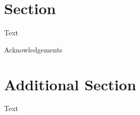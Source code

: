 \documentclass[sigconf,anonymous,review]{acmart}
\begin{document}

\section{Section}
Text

\begin{acks}
Acknowledgements
\end{acks}



% 


\appendix

\section{Additional Section}

Text
\end{document}
